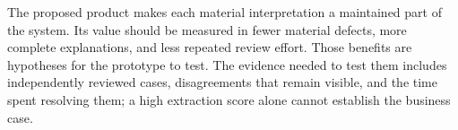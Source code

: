 The proposed product makes each material interpretation a maintained part of the
system. Its value should be measured in fewer material defects, more complete
explanations, and less repeated review effort. Those benefits are hypotheses for
the prototype to test. The evidence needed to test them includes independently
reviewed cases, disagreements that remain visible, and the time spent resolving
them; a high extraction score alone cannot establish the business case.
